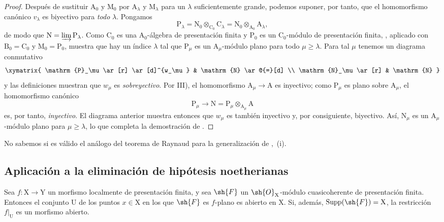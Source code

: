 \begin{proof}
Después de sustituir $\mathrm{A}_0$ y $\mathrm{M}_0$ por
$\mathrm{A}_\lambda$ y $\mathrm{M}_\lambda$ para un $\lambda$ suficientemente grande,
podemos suponer, por tanto, que el homomorfismo canónico
$v_\lambda$ es biyectivo para \emph{todo} $\lambda$. Pongamos
\[
  \mathrm{P}_\lambda
  =\mathrm{N}_0\otimes_{\mathrm{C}_0}\mathrm{C}_\lambda
  =\mathrm{N}_0\otimes_{\mathrm{A}_0}\mathrm{A}_\lambda,
\]
de modo que $\mathrm{N}=\varinjlim\mathrm{P}_\lambda$. Como
$\mathrm{C}_0$ es una $\mathrm{A}_0$-álgebra de presentación finita y
$\mathrm{P}_0$ es un $\mathrm{C}_0$-módulo de presentación finita,
, aplicado con
$\mathrm{B}_0=\mathrm{C}_0$ y $\mathrm{M}_0=\mathrm{P}_0$, muestra que
hay un índice $\lambda$ tal que $\mathrm{P}_\mu$ es un
$\mathrm{A}_\mu$-módulo plano para todo $\mu\geqslant\lambda$. Para tal
$\mu$ tenemos un diagrama conmutativo
\[
\xymatrix{
  \mathrm{P}_\mu \ar[r] \ar[d]^{w_\mu} & \mathrm{N} \ar@{=}[d] \\
  \mathrm{N}_\mu \ar[r] & \mathrm{N}
}
\]
y las definiciones muestran que $w_\mu$ es \emph{sobreyectivo}. Por III), el
homomorfismo $\mathrm{A}_\mu\to\mathrm{A}$ es inyectivo; como
$\mathrm{P}_\mu$ es plano sobre $\mathrm{A}_\mu$, el homomorfismo canónico
\[
  \mathrm{P}_\mu\longrightarrow
  \mathrm{N}
  =\mathrm{P}_\mu\otimes_{\mathrm{A}_\mu}\mathrm{A}
\]
es, por tanto, \emph{inyectivo}. El diagrama anterior muestra entonces que
$w_\mu$ es también inyectivo y, por consiguiente, biyectivo. Así,
$\mathrm{N}_\mu$ es un $\mathrm{A}_\mu$-módulo plano para
$\mu\geqslant\lambda$, lo que completa la demostración de
.
\end{proof}

\begin{remark}[11.2.10]
\label{IV.11.2.10}
No sabemos si es válido el análogo del teorema de Raynaud para la
generalización de ,~(i).
\end{remark}

\subsection{Aplicación a la eliminación de hipótesis noetherianas}
\label{subsection:IV.11.3}
\label{IV.11.3}


\begin{theorem}[11.3.1]
\label{IV.11.3.1}
Sea $f:\mathrm{X}\to\mathrm{Y}$ un morfismo localmente de
presentación finita, y sea $\sh{F}$ un $\sh{O}_\mathrm{X}$-módulo
cuasicoherente de presentación finita. Entonces el conjunto
$\mathrm{U}$ de los puntos $x\in\mathrm{X}$ en los que $\sh{F}$ es
$f$-plano es abierto en $\mathrm{X}$. Si, además,
$\operatorname{Supp}(\sh{F})=\mathrm{X}$, la restricción
$f|_\mathrm{U}$ es un morfismo abierto.
\end{theorem}

